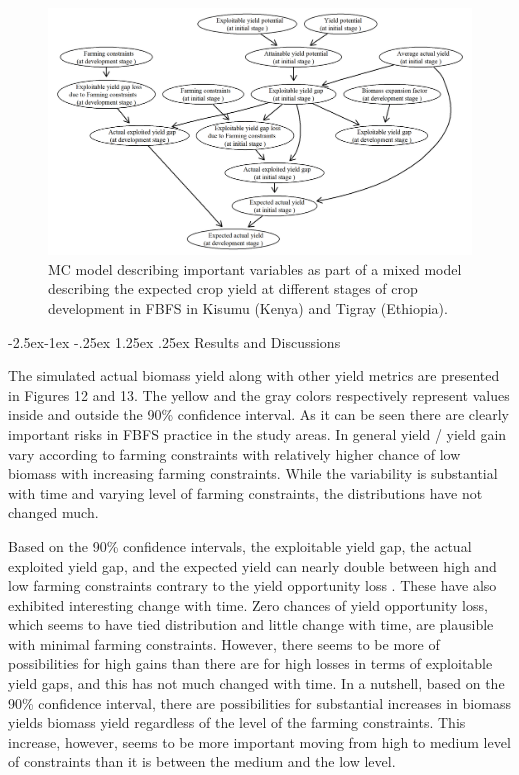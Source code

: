 \documentclass[12pt,oneside]{article}
\makeatletter
\renewcommand\paragraph{\@startsection{paragraph}{4}{\z@}%
            {-2.5ex\@plus -1ex \@minus -.25ex}%
            {1.25ex \@plus .25ex}%
            {\normalfont\normalsize\bfseries}}
\makeatother
\begin{document}
\begin{figure}[!htbp]

{\centering \includegraphics[width=1\linewidth,]{figures/Modelling_FBFS_Monte_carlo_model} 

}

\caption{MC model describing important variables as part of a mixed model describing the expected crop yield at different stages of crop development in FBFS in Kisumu (Kenya) and Tigray (Ethiopia).}\label{fig:fig7}
\end{figure}

\hypertarget{IV223}{%
\paragraph{Results and Discussions}\label{IV223}}

The simulated actual biomass yield along with other yield metrics are presented in Figures 12 and 13. The yellow and the gray colors respectively represent values inside and outside the 90\% confidence interval. As it can be seen there are clearly important risks in FBFS practice in the study areas. In general yield / yield gain vary according to farming constraints with relatively higher chance of low biomass with increasing farming constraints. While the variability is substantial with time and varying level of farming constraints, the distributions have not changed much.

Based on the 90\% confidence intervals, the exploitable yield gap, the actual exploited yield gap, and the expected yield can nearly double between high and low farming constraints contrary to the yield opportunity loss . These have also exhibited interesting change with time. Zero chances of yield opportunity loss, which seems to have tied distribution and little change with time, are plausible with minimal farming constraints. However, there seems to be more of possibilities for high gains than there are for high losses in terms of exploitable yield gaps, and this has not much changed with time. In a nutshell, based on the 90\% confidence interval, there are possibilities for substantial increases in biomass yields biomass yield regardless of the level of the farming constraints. This increase, however, seems to be more important moving from high to medium level of constraints than it is between the medium and the low level.
\end{document}
